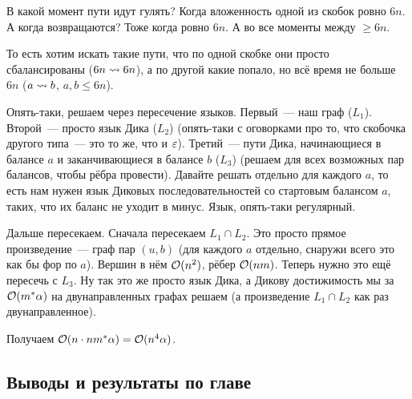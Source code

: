 \begin{enumerate}
    В какой момент пути идут гулять? Когда вложенность одной из скобок ровно $6n$. А когда возвращаются? Тоже когда ровно $6n$. А во все моменты между $\ge 6n$. 

    То есть хотим искать такие пути, что по одной скобке они просто сбалансированы ($6n \rightsquigarrow 6n$), а по другой какие попало, но всё время не больше $6n$ ($a \rightsquigarrow b$, $a, b \le 6n$). 

    Опять-таки, решаем через пересечение языков. Первый~--- наш граф ($L_1$). Второй~--- просто язык Дика ($L_2$) (опять-таки с оговорками про то, что скобочка другого типа~--- это то же, что и $\varepsilon$). Третий~--- пути Дика, начинающиеся в балансе $a$ и заканчивающиеся в балансе $b$ ($L_3$) (решаем для всех возможных пар балансов, чтобы рёбра провести). Давайте решать отдельно для каждого $a$, то есть нам нужен язык Диковых последовательностей со стартовым балансом $a$, таких, что их баланс не уходит в минус. Язык, опять-таки регулярный. 

    Дальше пересекаем. Сначала пересекаем $L_1 \cap L_2$. Это просто прямое произведение~--- граф пар $(u, b)$ (для каждого $a$ отдельно, снаружи всего это как бы фор по $a$). Вершин в нём $\mathcal{O}(n^2)$, рёбер $\mathcal{O}(n m)$. Теперь нужно это ещё пересечь с $L_3$. Ну так это же просто язык Дика, а Дикову достижимость мы за $\mathcal{O}(m^{*} \alpha)$ на двунаправленных графах решаем (а произведение $L_1 \cap L_2$ как раз двунаправленное). 

    Получаем $\mathcal{O}(n \cdot n m^{*} \alpha) = \mathcal{O}(n^4 \alpha)$.

\end{enumerate}

\subsection{Выводы и результаты по главе}